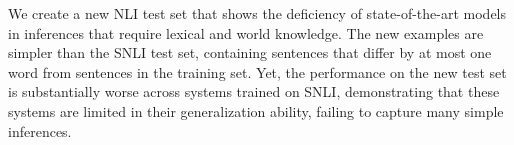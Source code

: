 We create a new NLI test set that shows the deficiency of state-of-the-art models in inferences that require lexical and world knowledge. The new examples are simpler than the SNLI test set, containing sentences that differ by at most one word from sentences in the training set. Yet, the performance on the new test set is substantially worse across systems trained on SNLI, demonstrating that these systems are limited in their generalization ability, failing to capture many simple inferences.
